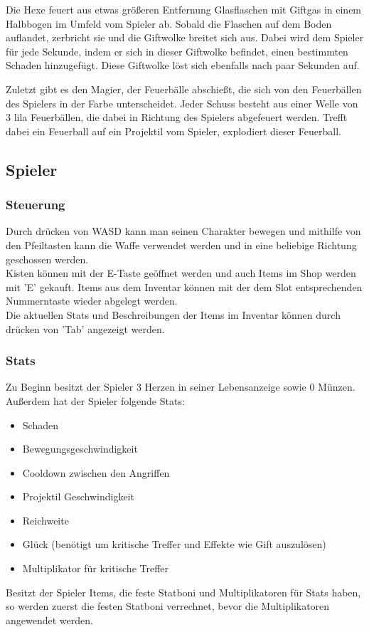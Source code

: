 
Die Hexe feuert aus etwas größeren Entfernung Glasflaschen mit Giftgas in einem Halbbogen im Umfeld vom Spieler ab. Sobald die Flaschen auf dem Boden auflandet, zerbricht sie und die Giftwolke breitet sich aus. Dabei wird dem Spieler für jede Sekunde, indem er sich in dieser Giftwolke befindet, einen bestimmten Schaden hinzugefügt. Diese Giftwolke löst sich ebenfalls nach paar Sekunden auf.\\


Zuletzt gibt es den Magier, der Feuerbälle abschießt, die sich von den Feuerbällen des Spielers in der Farbe unterscheidet. Jeder Schuss besteht aus einer Welle von 3 lila Feuerbällen, die dabei in Richtung des Spielers abgefeuert werden. Trefft dabei ein Feuerball auf ein Projektil vom Spieler, explodiert dieser Feuerball.\\


\subsection{Spieler}
\subsubsection{Steuerung}
Durch drücken von WASD kann man seinen Charakter bewegen und mithilfe von den Pfeiltasten kann die Waffe verwendet werden und in eine beliebige Richtung geschossen werden. \\
Kisten können mit der E-Taste geöffnet werden und auch Items im Shop werden mit 'E' gekauft. Items aus dem Inventar können mit der dem Slot entsprechenden Nummerntaste wieder abgelegt werden. \\
Die aktuellen Stats und Beschreibungen der Items im Inventar können durch drücken von 'Tab' angezeigt werden.

\subsubsection{Stats}
Zu Beginn besitzt der Spieler 3 Herzen in seiner Lebensanzeige sowie 0 Münzen. Außerdem hat der Spieler folgende Stats:
\begin{itemize}
\item Schaden
\item Bewegungsgeschwindigkeit
\item Cooldown zwischen den Angriffen
\item Projektil Geschwindigkeit
\item Reichweite
\item Glück (benötigt um kritische Treffer und Effekte wie Gift auszulösen)
\item Multiplikator für kritische Treffer
\end{itemize}
Besitzt der Spieler Items, die feste Statboni und Multiplikatoren für Stats haben, so werden zuerst die festen Statboni verrechnet, bevor die Multiplikatoren angewendet werden.

